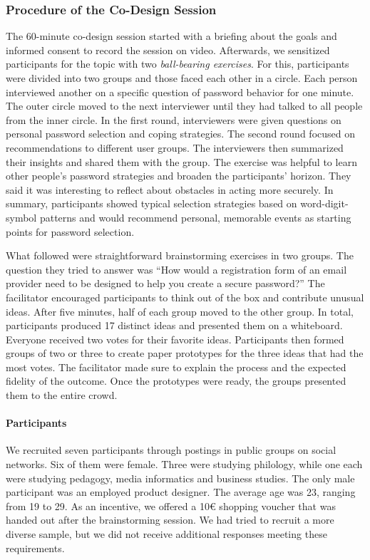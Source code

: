 \subsubsection{Procedure of the Co-Design Session}
The 60-minute co-design session started with a briefing about the goals and informed consent to record the session on video. Afterwards, we sensitized participants for the topic with two \textit{ball-bearing exercises}. For this, participants were divided into two groups and those faced each other in a circle. Each person interviewed another on a specific question of password behavior for one minute. The outer circle moved to the next interviewer until they had talked to all people from the inner circle. In the first round, interviewers were given questions on personal password selection and coping strategies. The second round focused on recommendations to different user groups. The interviewers then summarized their insights and shared them with the group. The exercise was helpful to learn other people's password strategies and broaden the participants' horizon. They said it was interesting to reflect about obstacles in acting more securely. In summary, participants showed typical selection strategies based on word-digit-symbol patterns and would recommend personal, memorable events as starting points for password selection.

What followed were straightforward brainstorming exercises in two groups. The question they tried to answer was ``How would a registration form of an email provider need to be designed to help you create a secure password?'' The facilitator encouraged participants to think out of the box and contribute unusual ideas. After five minutes, half of each group moved to the other group. In total, participants produced 17 distinct ideas and presented them on a whiteboard. Everyone received two votes for their favorite ideas. Participants then formed groups of two or three to create paper prototypes for the three ideas that had the most votes. The facilitator made sure to explain the process and the expected fidelity of the outcome. Once the prototypes were ready, the groups presented them to the entire crowd.

\paragraph{Participants}
We recruited seven participants through postings in public groups on social networks. Six of them were female. Three were studying philology, while one each were studying pedagogy, media informatics and business studies. The only male participant was an employed product designer. The average age was 23, ranging from 19 to 29. As an incentive, we offered a 10€ shopping voucher that was handed out after the brainstorming session. We had tried to recruit a more diverse sample, but we did not receive additional responses meeting these requirements. 

